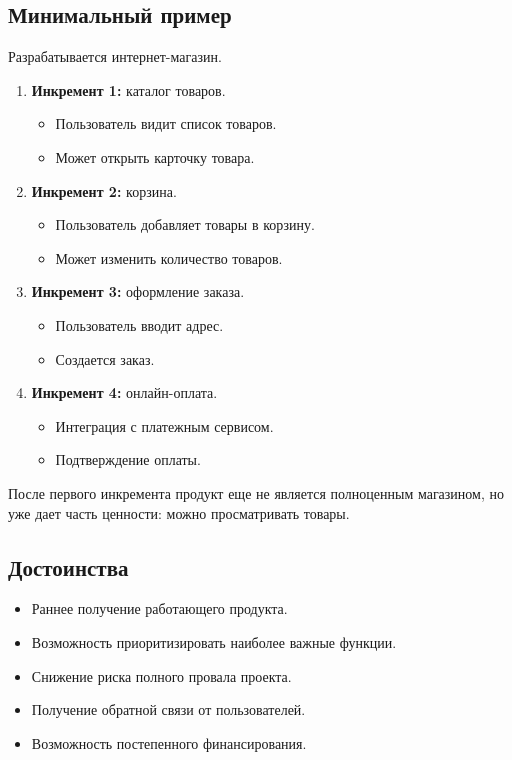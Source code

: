 \documentclass[12pt,a4paper]{article}
\begin{document}
\subsection{Минимальный пример}

Разрабатывается интернет-магазин.

\begin{enumerate}
    \item \textbf{Инкремент 1:} каталог товаров.
    \begin{itemize}
        \item Пользователь видит список товаров.
        \item Может открыть карточку товара.
    \end{itemize}

    \item \textbf{Инкремент 2:} корзина.
    \begin{itemize}
        \item Пользователь добавляет товары в корзину.
        \item Может изменить количество товаров.
    \end{itemize}

    \item \textbf{Инкремент 3:} оформление заказа.
    \begin{itemize}
        \item Пользователь вводит адрес.
        \item Создается заказ.
    \end{itemize}

    \item \textbf{Инкремент 4:} онлайн-оплата.
    \begin{itemize}
        \item Интеграция с платежным сервисом.
        \item Подтверждение оплаты.
    \end{itemize}
\end{enumerate}

После первого инкремента продукт еще не является полноценным магазином, но уже дает часть ценности: можно просматривать товары.

\subsection{Достоинства}

\begin{itemize}
    \item Раннее получение работающего продукта.
    \item Возможность приоритизировать наиболее важные функции.
    \item Снижение риска полного провала проекта.
    \item Получение обратной связи от пользователей.
    \item Возможность постепенного финансирования.
\end{itemize}
\end{document}
